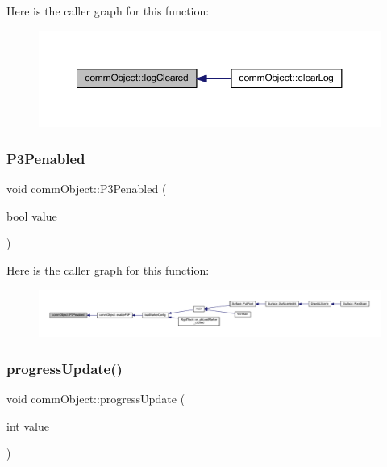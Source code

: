 Here is the caller graph for this function\+:
\nopagebreak
\begin{figure}[H]
\begin{center}
\leavevmode
\includegraphics[width=350pt]{classcomm_object_af2304085624c26230e9d930d616e3e19_icgraph}
\end{center}
\end{figure}
\mbox{\label{classcomm_object_af369de87a7f2c9b7170223bedd6c08d9}} 
\subsubsection{\texorpdfstring{P3\+Penabled}{P3Penabled}}
{\footnotesize\ttfamily void comm\+Object\+::\+P3\+Penabled (\begin{DoxyParamCaption}\item[{bool}]{value }\end{DoxyParamCaption})\hspace{0.3cm}{\ttfamily [signal]}}

Here is the caller graph for this function\+:
\nopagebreak
\begin{figure}[H]
\begin{center}
\leavevmode
\includegraphics[width=350pt]{classcomm_object_af369de87a7f2c9b7170223bedd6c08d9_icgraph}
\end{center}
\end{figure}
\mbox{\label{classcomm_object_acfc97f4310e2b7d841ecb8cf8be0088e}} 
\subsubsection{\texorpdfstring{progress\+Update()}{progressUpdate()}}
{\footnotesize\ttfamily void comm\+Object\+::progress\+Update (\begin{DoxyParamCaption}\item[{int}]{value }\end{DoxyParamCaption})}



